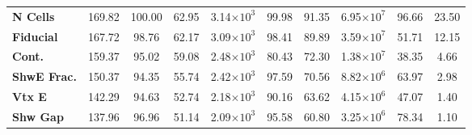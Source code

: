 \begin{table}[!hb]
\begin{tabular}{|l|ccc|ccc|ccc|}
\textbf{N Cells}        & 169.82            & 100.00                                                             & 62.95                                     & 3.14$\times 10^3$           & 99.98                                                               & 91.35                                      & 6.95$\times 10^7$ & 96.66                                                              & 23.50                                     \\
\textbf{Fiducial}     & 167.72            & 98.76                                                              & 62.17                                     & 3.09$\times 10^3$           & 98.41                                                               & 89.89                                      & 3.59$\times 10^7$          & 51.71                                                              & 12.15                                     \\
\textbf{Cont.}  & 159.37            & 95.02                                                              & 59.08                                     & 2.48$\times 10^3$           & 80.43                                                               & 72.30                                      & 1.38$\times 10^7$          & 38.35                                                              & 4.66                                      \\
\textbf{ShwE Frac.}  & 150.37            & 94.35                                                              & 55.74                                     & 2.42$\times 10^3$           & 97.59                                                               & 70.56                                      & 8.82$\times 10^6$          & 63.97                                                              & 2.98                                      \\
\textbf{Vtx E}         & 142.29            & 94.63                                                              & 52.74                                     & 2.18$\times 10^3$           & 90.16                                                               & 63.62                                      & 4.15$\times 10^6$          & 47.07                                                              & 1.40                                      \\
\textbf{Shw Gap}          & 137.96            & 96.96                                                              & 51.14                                     & 2.09$\times 10^3$           & 95.58                                                               & 60.80                                      & 3.25$\times 10^6$          & 78.34                                                              & 1.10                                      \\

\end{tabular}
\end{table}

